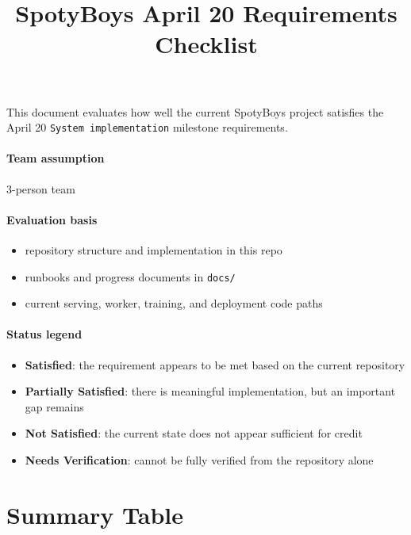 \documentclass[11pt,a4paper]{article}
\title{\textbf{SpotyBoys April 20 Requirements Checklist}}
\author{}
\date{}
\begin{document}
\maketitle

This document evaluates how well the current SpotyBoys project satisfies the April 20 \texttt{System implementation} milestone requirements.

\paragraph{Team assumption} 3-person team

\paragraph{Evaluation basis}
\begin{itemize}
  \item repository structure and implementation in this repo
  \item runbooks and progress documents in \texttt{docs/}
  \item current serving, worker, training, and deployment code paths
\end{itemize}

\paragraph{Status legend}
\begin{itemize}
  \item \textbf{Satisfied}: the requirement appears to be met based on the current repository
  \item \textbf{Partially Satisfied}: there is meaningful implementation, but an important gap remains
  \item \textbf{Not Satisfied}: the current state does not appear sufficient for credit
  \item \textbf{Needs Verification}: cannot be fully verified from the repository alone
\end{itemize}

\section{Summary Table}
\end{document}

